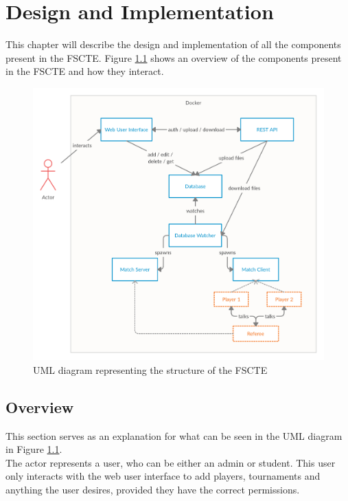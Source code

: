 \documentclass[a4paper, 12pt]{report}
\begin{document}
\chapter{Design and Implementation}
\label{chap:design}

This chapter will describe the design and implementation of all the components
present in the FSCTE. Figure \ref{fig:uml-structure} shows an overview of the
components present in the FSCTE and how they interact.
\begin{figure}[H]
	\centering
	\includegraphics[scale=0.25]{uml-structure.png}
	\caption{UML diagram representing the structure of the FSCTE}
	\label{fig:uml-structure}
\end{figure}

\section{Overview}
\label{sec:impl-overview}

This section serves as an explanation for what can be seen in the UML diagram in
Figure \ref{fig:uml-structure}. \\

The actor represents a user, who can be either an admin or student. This user
only interacts with the web user interface to add players, tournaments and anything
the user desires, provided they have the correct permissions. \\
\end{document}
